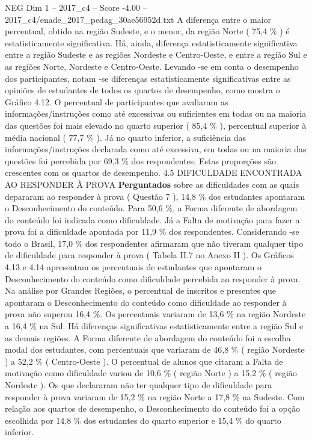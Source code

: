 \begin{textsample}{NEG Dim 1 – 2017\_c4 – Score -4.00 – 2017\_c4/enade\_2017\_pedag\_30ae56952d.txt}
A diferença entre o maior percentual, obtido na região Sudeste, e o menor, da região Norte ( 75,4 \% ) é estatisticamente significativa.
Há, ainda, diferença estatisticamente significativa entre a região Sudeste e as regiões Nordeste e Centro-Oeste, e entre a região Sul e as regiões Norte, Nordeste e Centro-Oeste.
Levando -se em conta o desempenho dos participantes, notam -se diferenças estatisticamente significativas entre as opiniões de estudantes de todos os quartos de desempenho, como mostra o Gráfico 4.12.
O percentual de participantes que avaliaram as informações/instruções como até excessivas ou suficientes em todas ou na maioria das questões foi mais elevado no quarto superior ( 85,4 \% ), percentual superior à média nacional ( 77,7 \% ).
Já no quarto inferior, a suficiência das informações/instruções declarada como até excessiva, em todas ou na maioria das questões foi percebida por 69,3 \% dos respondentes.
Estas proporções são crescentes com os quartos de desempenho. 4.5 DIFICULDADE ENCONTRADA AO RESPONDER À PROVA \textbf{Perguntados} sobre as dificuldades com as quais depararam ao responder à prova ( Questão 7 ), 14,8 \% dos estudantes apontaram o Desconhecimento do conteúdo.
Para 50,6 \%, a Forma diferente de abordagem do conteúdo foi indicada como dificuldade.
Já a Falta de motivação para fazer a prova foi a dificuldade apontada por 11,9 \% dos respondentes.
Considerando -se todo o Brasil, 17,0 \% dos respondentes afirmaram que não tiveram qualquer tipo de dificuldade para responder à prova ( Tabela II.7 no Anexo II ).
Os Gráficos 4.13 e 4.14 apresentam os percentuais de estudantes que apontaram o Desconhecimento do conteúdo como dificuldade percebida ao responder à prova.
Na análise por Grandes Regiões, o percentual de inscritos e presentes que apontaram o Desconhecimento do conteúdo como dificuldade ao responder à prova não superou 16,4 \%.
Os percentuais variaram de 13,6 \% na região Nordeste a 16,4 \% na Sul.
Há diferenças significativas estatisticamente entre a região Sul e as demais regiões.
A Forma diferente de abordagem do conteúdo foi a escolha modal dos estudantes, com percentuais que variaram de 46,8 \% ( região Nordeste ) a 52,2 \% ( Centro-Oeste ).
O percentual de alunos que citaram a Falta de motivação como dificuldade variou de 10,6 \% ( região Norte ) a 15,2 \% ( região Nordeste ).
Os que declararam não ter qualquer tipo de dificuldade para responder à prova variaram de 15,2 \% na região Norte a 17,8 \% na Sudeste.
Com relação aos quartos de desempenho, o Desconhecimento do conteúdo foi a opção escolhida por 14,8 \% dos estudantes do quarto superior e 15,4 \% do quarto inferior.

\end{textsample}
